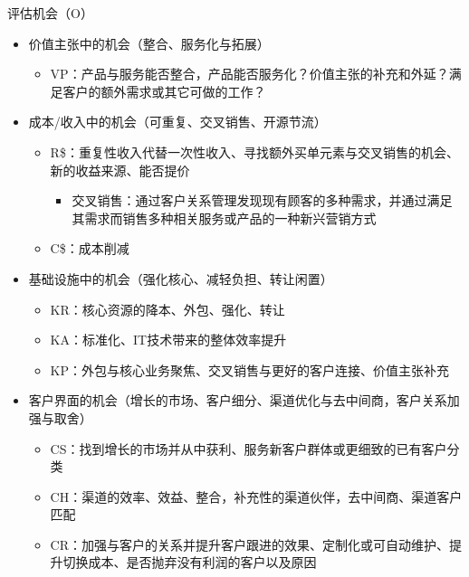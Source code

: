 评估机会（O）
\begin{itemize}
    \item 价值主张中的机会（整合、服务化与拓展）
    \begin{itemize}
        \item VP：产品与服务能否整合，产品能否服务化？价值主张的补充和外延？满足客户的额外需求或其它可做的工作？
    \end{itemize}
    \item 成本/收入中的机会（可重复、交叉销售、开源节流）
    \begin{itemize}
        \item  R\$：重复性收入代替一次性收入、寻找额外买单元素与交叉销售的机会、新的收益来源、能否提价
        \begin{itemize}
            \item 交叉销售：通过客户关系管理发现现有顾客的多种需求，并通过满足其需求而销售多种相关服务或产品的一种新兴营销方式
        \end{itemize}
        \item C\$：成本削减
    \end{itemize}
    \item 基础设施中的机会（强化核心、减轻负担、转让闲置）
    \begin{itemize}
        \item KR：核心资源的降本、外包、强化、转让
        \item KA：标准化、IT技术带来的整体效率提升
        \item KP：外包与核心业务聚焦、交叉销售与更好的客户连接、价值主张补充
    \end{itemize}
    \item 客户界面的机会（增长的市场、客户细分、渠道优化与去中间商，客户关系加强与取舍）
    \begin{itemize}
        \item CS：找到增长的市场并从中获利、服务新客户群体或更细致的已有客户分类
        \item CH：渠道的效率、效益、整合，补充性的渠道伙伴，去中间商、渠道客户匹配
        \item CR：加强与客户的关系并提升客户跟进的效果、定制化或可自动维护、提升切换成本、是否抛弃没有利润的客户以及原因  
    \end{itemize}
\end{itemize}

